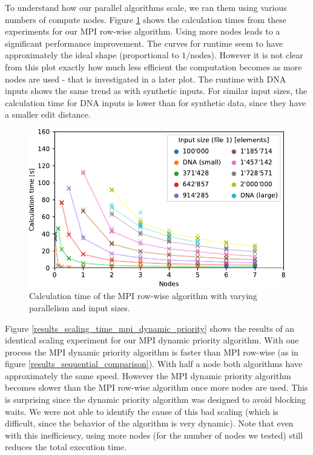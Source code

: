 To understand how our parallel algorithms scale, we ran them using various numbers of compute nodes. Figure \ref{results_scaling_time_mpi_row_wise} shows the calculation times from these experiments for our MPI row-wise algorithm. Using more nodes leads to a significant performance improvement. The curves for runtime seem to have approximately the ideal shape (proportional to $1 / \text{nodes}$). However it is not clear from this plot exactly how much less efficient the computation becomes as more nodes are used - that is investigated in a later plot. The runtime with DNA inputs shows the same trend as with synthetic inputs. For similar input sizes, the calculation time for DNA inputs is lower than for synthetic data, since they have a smaller edit distance.

\begin{figure}[hbt]\centering
  \includegraphics[width=\linewidth]{images/scaling-time-mpi-row-wise.pdf}
  \caption{Calculation time of the MPI row-wise algorithm with varying parallelism and input sizes.}
  \label{results_scaling_time_mpi_row_wise}
\end{figure}

Figure \ref{results_scaling_time_mpi_dynamic_priority} shows the results of an identical scaling experiment for our MPI dynamic priority algorithm. With one process the MPI dynamic priority algorithm is faster than MPI row-wise (as in figure \ref{results_sequential_comparison}). With half a node both algorithms have approximately the same speed. However the MPI dynamic priority algorithm becomes slower than the MPI row-wise algorithm once more nodes are used. This is surprising since the dynamic priority algorithm was designed to avoid blocking waits. We were not able to identify the cause of this bad scaling (which is difficult, since the behavior of the algorithm is very dynamic). Note that even with this inefficiency, using more nodes (for the number of nodes we tested) still reduces the total execution time. 


